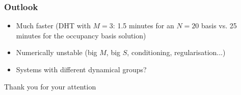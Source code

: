 \documentclass[english]{beamer}
\begin{document}
  \begin{frame}
  	\frametitle{Outlook}
  	\begin{itemize}
  		\item Much faster (DHT with $M=3$: 1.5 minutes for an $N=20$ basis vs. 25 minutes for the occupancy basis solution)
  		\item Numerically unstable (big $M$, big $S$, conditioning, regularisation...)
  		\item Systems with different dynamical groups?
  	\end{itemize}
  \end{frame}
  
  \begin{frame}[plain,c]
  	\begin{center}
  	  \Huge Thank you for your attention
  	\end{center}
  \end{frame}
\end{document}

